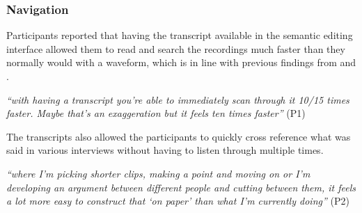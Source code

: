 




\subsubsection{Navigation}

Participants reported that having the transcript available in the semantic
editing interface allowed them to read and search the recordings much faster
than they normally would with a waveform, which is in line with previous findings from
\citet{Whittaker2004} and \citet{Yoon2014}.

\textit{``with having a transcript you're able to immediately scan through it
  10/15 times faster. Maybe that's an exaggeration but it feels ten times
  faster''} (P1)

The transcripts also allowed the participants to quickly cross reference what
was said in various interviews without having to listen through multiple times.

\textit{``where I'm picking shorter clips, making a point and moving on or I'm
  developing an argument between different people and cutting between them, it
  feels a lot more easy to construct that `on paper' than what I'm currently
  doing''} (P2)

